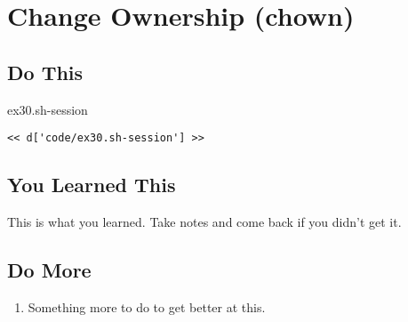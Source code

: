 \chapter{Change Ownership (chown)}

\section{Do This}

\begin{code}{ex30.sh-session}
\begin{Verbatim}
<< d['code/ex30.sh-session'] >>
\end{Verbatim}
\end{code}


\section{You Learned This}

This is what you learned.  Take notes and come back if you didn't get it.

\section{Do More}

\begin{enumerate}
\item Something more to do to get better at this.
\end{enumerate}

